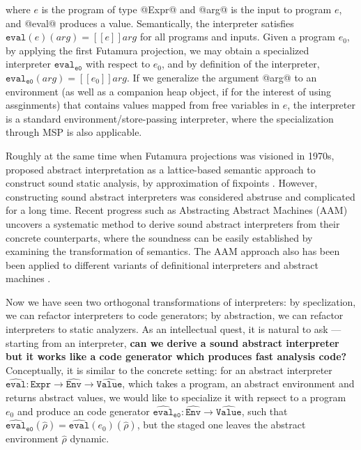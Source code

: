 where $e$ is the program of type @Expr@ and @arg@ is the input to program $e$,
and @eval@ produces a value.
Semantically, the interpreter satisfies $ \texttt{eval}(e)(arg) = [\![ e ]\!] arg$ for all
programs and inputs. Given a program $e_0$, by applying the first Futamura
projection, we may obtain a specialized interpreter
$\texttt{eval}_{\texttt{e0}}$ with respect to $e_0$, and by definition of the interpreter, 
$\texttt{eval}_{\texttt{e0}}(arg) = [\![ e_0 ]\!] arg $. If we generalize the
argument @arg@ to an environment (as well as a companion heap object, if for the
interest of using assginments) that contains values mapped from free variables
in $e$, the interpreter is a standard environment/store-passing interpreter,
where the specialization through MSP is also applicable.

Roughly at the same time when Futamura projections was visioned in 1970s,
\citeauthor{DBLP:conf/popl/CousotC77} proposed abstract interpretation as a
lattice-based semantic approach to construct sound static analysis, by
approximation of fixpoints \cite{DBLP:conf/popl/CousotC77}. However,
constructing sound abstract interpreters was considered abstruse and complicated
for a long time.
Recent progress such as Abstracting Abstract Machines (AAM)
uncovers a systematic method to derive sound abstract interpreters from their
concrete counterparts, where the soundness can be easily established by
examining the transformation of semantics.
The AAM approach also has been been applied to different variants of
definitional interpreters and abstract machines \cite{DBLP:journals/jfp/HornM12,
DBLP:conf/icfp/HornM10, DBLP:journals/pacmpl/DaraisLNH17}.

Now we have seen two orthogonal transformations of interpreters: by
speclization, we can refactor interpreters to code generators; by abstraction,
we can refactor interpreters to static analyzers. As an intellectual quest, it
is natural to ask --- starting from an interpreter, \textbf{can we derive a
sound abstract interpreter but it works like a code generator which produces fast
analysis code?} Conceptually, it is similar to the concrete setting: for an
abstract interpreter $\widehat{\texttt{eval}}: \texttt{Expr} \to
\widehat{\texttt{Env}} \to \widehat{\texttt{Value}}$, which takes a program, an abstract
environment and returns abstract values, we would like to specialize it with
repsect to a program $e_0$ and produce an code generator
$\widehat{\texttt{eval}}_{\texttt{e0}} : \widehat{\texttt{Env}} \to
\widehat{\texttt{Value}}$, such that $
\widehat{\texttt{eval}}_{\texttt{e0}}(\widehat{\rho}) =
\widehat{\texttt{eval}}(e_0)(\widehat{\rho})$, but the staged one leaves the
abstract environment $\widehat{\rho}$ dynamic.

